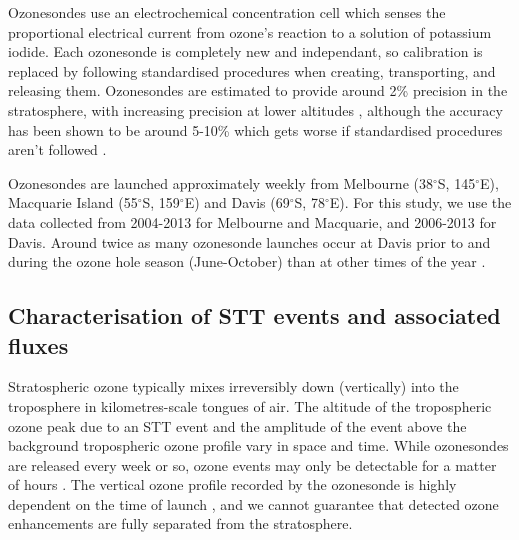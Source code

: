 \documentclass{article}
\begin{document}
    Ozonesondes use an electrochemical concentration cell which senses the proportional electrical current from ozone's reaction to a solution of potassium iodide.
    Each ozonesonde is completely new and independant, so calibration is replaced by following standardised procedures when creating, transporting, and releasing them.
    Ozonesondes are estimated to provide around 2\% precision in the stratosphere, with increasing precision at lower altitudes \citep{noaasondes}, although the accuracy has been shown to be around 5-10\% which gets worse if standardised procedures aren't followed \citep{Smit2007}.
    
    Ozonesondes are launched approximately weekly from Melbourne (38$^{\circ}$S, 145$^{\circ}$E), Macquarie Island (55$^{\circ}$S, 159$^{\circ}$E) and Davis (69$^{\circ}$S, 78$^{\circ}$E). 
    For this study, we use the data collected from 2004-2013 for Melbourne and Macquarie, and 2006-2013 for Davis. 
    Around twice as many ozonesonde launches occur at Davis prior to and during the ozone hole season (June-October) than at other times of the year \citep{Alexander2013}.
    

  \subsection{Characterisation of STT events and associated fluxes}
    \label{Section:CharacterisationOfSTTs}
    
    Stratospheric ozone typically mixes irreversibly down (vertically) into the troposphere in kilometres-scale tongues of air.
    The altitude of the tropospheric ozone peak due to an STT event and the amplitude of the event above the background tropospheric ozone profile vary in space and time.
    While ozonesondes are released every week or so, ozone events may only be detectable for a matter of hours \citep{Tang2012}.
    The vertical ozone profile recorded by the ozonesonde is highly dependent on the time of launch \citep{Sprenger2003}, and we cannot guarantee that detected ozone enhancements are fully separated from the stratosphere.
    
\end{document}
